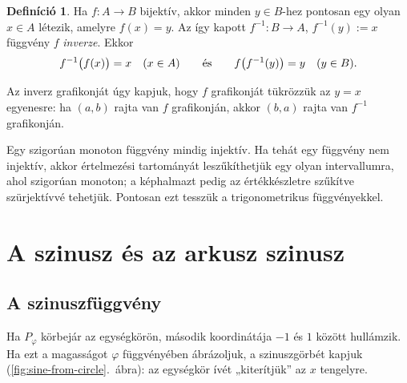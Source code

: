 \documentclass[11pt]{scrartcl}
\theoremstyle{definition}
\newtheorem{definition}{Definíció}
\theoremstyle{remark}
\begin{document}
\begin{definition}
	Ha $f\colon A \to B$ bijektív, akkor minden $y \in B$-hez pontosan egy
	olyan $x \in A$ létezik, amelyre $f(x) = y$. Az így kapott
	$f^{-1}\colon B \to A$, $f^{-1}(y) := x$ függvény $f$ \emph{inverze}. Ekkor
	\[
		f^{-1}\bigl(f(x)\bigr) = x \quad (x \in A)
		\qquad\text{és}\qquad
		f\bigl(f^{-1}(y)\bigr) = y \quad (y \in B)\text.
	\]
\end{definition}

Az inverz grafikonját úgy kapjuk, hogy $f$ grafikonját tükrözzük az $y = x$
egyenesre: ha $(a, b)$ rajta van $f$ grafikonján, akkor $(b, a)$ rajta van
$f^{-1}$ grafikonján.

Egy szigorúan monoton függvény mindig injektív. Ha tehát egy függvény nem
injektív, akkor értelmezési tartományát leszűkíthetjük egy olyan
intervallumra, ahol szigorúan monoton; a képhalmazt pedig az értékkészletre
szűkítve szürjektívvé tehetjük. Pontosan ezt tesszük a trigonometrikus
függvényekkel.

\section{A szinusz és az arkusz szinusz}

\subsection{A szinuszfüggvény}

Ha $P_\varphi$ körbejár az egységkörön, második koordinátája $-1$ és $1$
között hullámzik. Ha ezt a magasságot $\varphi$ függvényében ábrázoljuk, a
szinuszgörbét kapjuk (\ref{fig:sine-from-circle}.~ábra): az egységkör ívét
„kiterítjük” az $x$ tengelyre.
\end{document}
